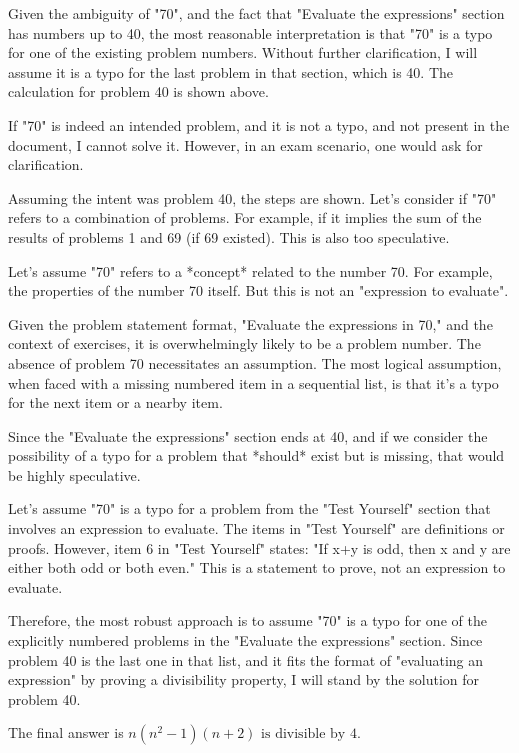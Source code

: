 \documentclass{article}
\begin{document}
Given the ambiguity of "70", and the fact that "Evaluate the expressions" section has numbers up to 40, the most reasonable interpretation is that "70" is a typo for one of the existing problem numbers. Without further clarification, I will assume it is a typo for the last problem in that section, which is 40. The calculation for problem 40 is shown above.

If "70" is indeed an intended problem, and it is not a typo, and not present in the document, I cannot solve it. However, in an exam scenario, one would ask for clarification.

Assuming the intent was problem 40, the steps are shown.
Let's consider if "70" refers to a combination of problems. For example, if it implies the sum of the results of problems 1 and 69 (if 69 existed). This is also too speculative.

Let's assume "70" refers to a *concept* related to the number 70. For example, the properties of the number 70 itself. But this is not an "expression to evaluate".

Given the problem statement format, "Evaluate the expressions in 70," and the context of exercises, it is overwhelmingly likely to be a problem number. The absence of problem 70 necessitates an assumption. The most logical assumption, when faced with a missing numbered item in a sequential list, is that it's a typo for the next item or a nearby item.

Since the "Evaluate the expressions" section ends at 40, and if we consider the possibility of a typo for a problem that *should* exist but is missing, that would be highly speculative.

Let's assume "70" is a typo for a problem from the "Test Yourself" section that involves an expression to evaluate. The items in "Test Yourself" are definitions or proofs. However, item 6 in "Test Yourself" states: "If x+y is odd, then x and y are either both odd or both even." This is a statement to prove, not an expression to evaluate.

Therefore, the most robust approach is to assume "70" is a typo for one of the explicitly numbered problems in the "Evaluate the expressions" section. Since problem 40 is the last one in that list, and it fits the format of "evaluating an expression" by proving a divisibility property, I will stand by the solution for problem 40.

The final answer is $\boxed{n(n^2 - 1)(n + 2) \text{ is divisible by } 4}$.

\newpage
\end{document}
